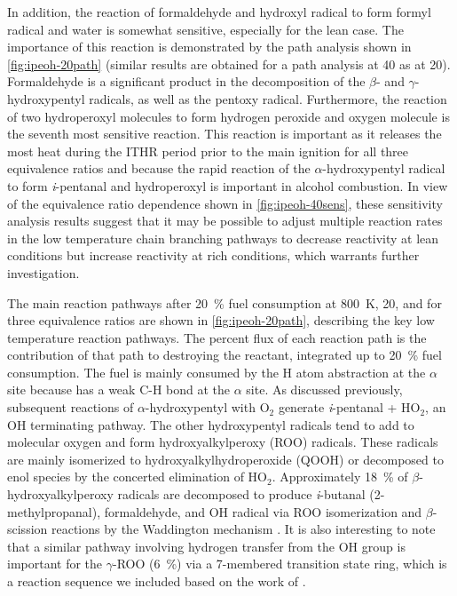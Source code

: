 \documentclass[../main.tex]{subfiles}
\begin{document}
In addition, the reaction of formaldehyde and hydroxyl radical to form
formyl radical and water is somewhat sensitive, especially for
the lean case. The importance of this reaction is demonstrated by the
path analysis shown in \cref{fig:ipeoh-20path} (similar results are
obtained for a path analysis at \SI{40}{\atmosphere} as at
\SI{20}{\atmosphere}). Formaldehyde is a significant product in
the decomposition of the $\beta$- and $\gamma$-hydroxypentyl radicals,
as well as the pentoxy radical. Furthermore, the reaction of two
hydroperoxyl molecules to form hydrogen peroxide and oxygen molecule is the
seventh most sensitive reaction. This reaction is important as it releases
the most heat during the ITHR period prior to the main ignition for all
three equivalence ratios and because the rapid reaction of the
$\alpha$-hydroxypentyl radical to form \textit{i}-pentanal and hydroperoxyl
is important in alcohol combustion. In view of the equivalence ratio
dependence shown in \cref{fig:ipeoh-40sens}, these sensitivity analysis
results suggest that it may be possible to adjust multiple reaction
rates in the low temperature chain branching pathways to decrease
reactivity at lean conditions but increase reactivity at rich
conditions, which warrants further investigation.

The main \iPeOH{} reaction pathways after \SI{20}{\percent} fuel consumption at
\SI{800}{\kelvin}, \SI{20}{\atmosphere}, and for three equivalence
ratios are shown in \cref{fig:ipeoh-20path}, describing the key low
temperature reaction pathways. The percent flux of each reaction path
is the contribution of that path to destroying the reactant, integrated
up to \SI{20}{\percent} fuel consumption. The fuel is mainly consumed by
the H atom abstraction at the $\alpha$ site because \iPeOH{} has a weak
C-H bond at the $\alpha$ site. As discussed previously, subsequent
reactions of $\alpha$-hydroxypentyl with O$_2$ generate \textit{i}-pentanal
+ HO$_2$, an OH terminating pathway. The other hydroxypentyl radicals tend
to add to molecular oxygen and form hydroxyalkylperoxy (ROO) radicals.
These radicals are mainly isomerized to hydroxyalkylhydroperoxide (QOOH)
or decomposed to enol species by the concerted elimination of HO$_2$. Approximately
\SI{18}{\percent} of $\beta$-hydroxyalkylperoxy radicals are decomposed to produce
\textit{i}-butanal (2-methylpropanal), formaldehyde, and OH radical via ROO
isomerization and $\beta$-scission reactions by the Waddington mechanism
\cite{Ray1973, Sway1983}. It is also interesting to note that a similar
pathway involving hydrogen transfer from the OH group is
important for the $\gamma$-ROO (\SI{6}{\percent}) via a 7-membered transition state
ring, which is a reaction sequence we included based on the work
of \textcite{Welz2012}.
\end{document}
